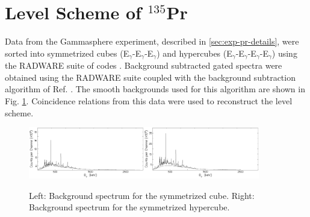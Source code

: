 \section{Level Scheme of $^{135}$Pr}
\label{sec:trw-lvl-scheme}
Data from the Gammasphere experiment, described in \ref{sec:exp-pr-details}, were sorted into symmetrized cubes (E$_{\gamma{}}$-E$_{\gamma{}}$-E$_{\gamma{}}$) and hypercubes (E$_{\gamma{}}$-E$_{\gamma{}}$-E$_{\gamma{}}$-E$_{\gamma{}}$) using the RADWARE suite of codes \cite{radware}. Background subtracted gated spectra were obtained using the RADWARE suite coupled with the background subtraction algorithm of Ref. \cite{symBGSub}. The smooth backgrounds used for this algorithm are shown in Fig. \ref{fig:chp4-bg-specs}. Coincidence relations from this data were used to reconstruct the level scheme.
\begin{figure}[bh!]
\centerline{\includegraphics[width=0.45\textwidth]{./img/c4/trips_bg.pdf}\includegraphics[width=0.45\textwidth]{./img/c4/quads_bg.pdf}}
	\caption{Left: Background spectrum for the symmetrized cube. Right: Background spectrum for the symmetrized hypercube. \label{fig:chp4-bg-specs}}
\end{figure}

